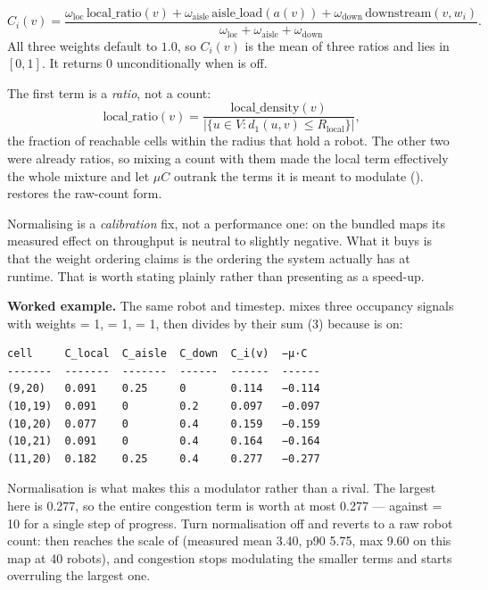 \begin{equation}
  C_i(v) = \frac{\omega_{\mathrm{loc}}\, \mathrm{local\_ratio}(v)
    + \omega_{\mathrm{aisle}}\, \mathrm{aisle\_load}(a(v))
    + \omega_{\mathrm{down}}\, \mathrm{downstream}(v, w_i)}
    {\omega_{\mathrm{loc}} + \omega_{\mathrm{aisle}} + \omega_{\mathrm{down}}}.
  \label{eq:congestion}
\end{equation}
All three weights default to $1.0$, so $C_i(v)$ is the mean of three ratios and
lies in $[0, 1]$. It returns $0$ unconditionally when
 is off.

The first term is a \emph{ratio}, not a count:
\begin{equation}
  \mathrm{local\_ratio}(v)
    = \frac{\mathrm{local\_density}(v)}{|\{u \in V : d_1(u, v) \leq R_{\mathrm{local}}\}|},
\end{equation}
the fraction of reachable cells within the radius that hold a robot. The other
two were already ratios, so mixing a count with them made the local term
effectively the whole mixture and let $\mu C$ outrank the terms it is meant to
modulate (). 
 restores the raw-count form.

\begin{caveat}
Normalising is a \emph{calibration} fix, not a performance one: on the bundled
maps its measured effect on throughput is neutral to slightly negative. What it
buys is that the weight ordering  claims is the ordering the
system actually has at runtime. That is worth stating plainly rather than
presenting as a speed-up.
\end{caveat}

\begin{workedexample}
\textbf{Worked example.} The same robot and timestep.  mixes three occupancy signals with weights  = 1,  = 1,  = 1, then divides by their sum (3) because  is on:

{\fontsize{9.0}{10.8}\selectfont
\begin{verbatim}
cell     C_local  C_aisle  C_down  C_i(v)  −μ·C
-------  -------  -------  ------  ------  ------
(9,20)   0.091    0.25     0       0.114   −0.114
(10,19)  0.091    0        0.2     0.097   −0.097
(10,20)  0.077    0        0.4     0.159   −0.159
(10,21)  0.091    0        0.4     0.164   −0.164
(11,20)  0.182    0.25     0.4     0.277   −0.277
\end{verbatim}
}

Normalisation is what makes this a modulator rather than a rival. The largest  here is 0.277, so the entire congestion term is worth at most 0.277 — against  = 10 for a single step of progress. Turn normalisation off and  reverts to a raw robot count:  then reaches the scale of  (measured mean 3.40, p90 5.75, max 9.60 on this map at 40 robots), and congestion stops modulating the smaller terms and starts overruling the largest one.
\end{workedexample}

